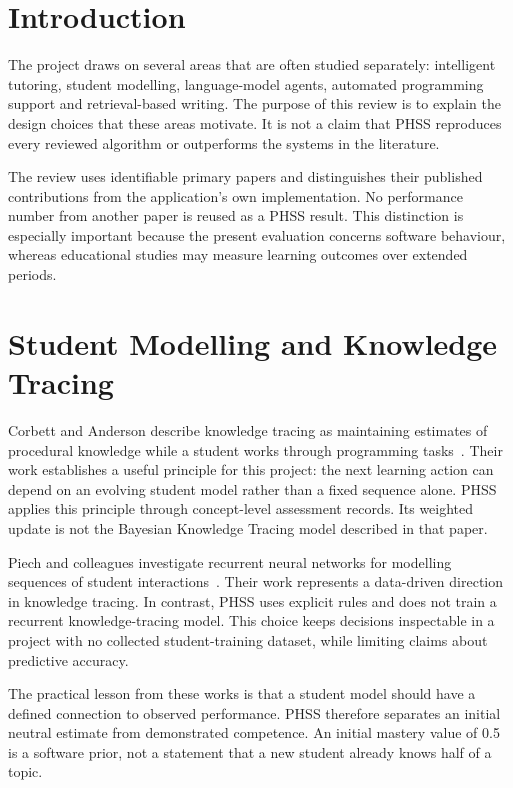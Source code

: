 \section{Introduction}
The project draws on several areas that are often studied separately: intelligent tutoring, student modelling, language-model agents, automated programming support and retrieval-based writing. The purpose of this review is to explain the design choices that these areas motivate. It is not a claim that PHSS reproduces every reviewed algorithm or outperforms the systems in the literature.

The review uses identifiable primary papers and distinguishes their published contributions from the application's own implementation. No performance number from another paper is reused as a PHSS result. This distinction is especially important because the present evaluation concerns software behaviour, whereas educational studies may measure learning outcomes over extended periods.

\section{Student Modelling and Knowledge Tracing}
Corbett and Anderson describe knowledge tracing as maintaining estimates of procedural knowledge while a student works through programming tasks~\cite{corbett1994}. Their work establishes a useful principle for this project: the next learning action can depend on an evolving student model rather than a fixed sequence alone. PHSS applies this principle through concept-level assessment records. Its weighted update is not the Bayesian Knowledge Tracing model described in that paper.

Piech and colleagues investigate recurrent neural networks for modelling sequences of student interactions~\cite{piech2015}. Their work represents a data-driven direction in knowledge tracing. In contrast, PHSS uses explicit rules and does not train a recurrent knowledge-tracing model. This choice keeps decisions inspectable in a project with no collected student-training dataset, while limiting claims about predictive accuracy.

The practical lesson from these works is that a student model should have a defined connection to observed performance. PHSS therefore separates an initial neutral estimate from demonstrated competence. An initial mastery value of 0.5 is a software prior, not a statement that a new student already knows half of a topic.

